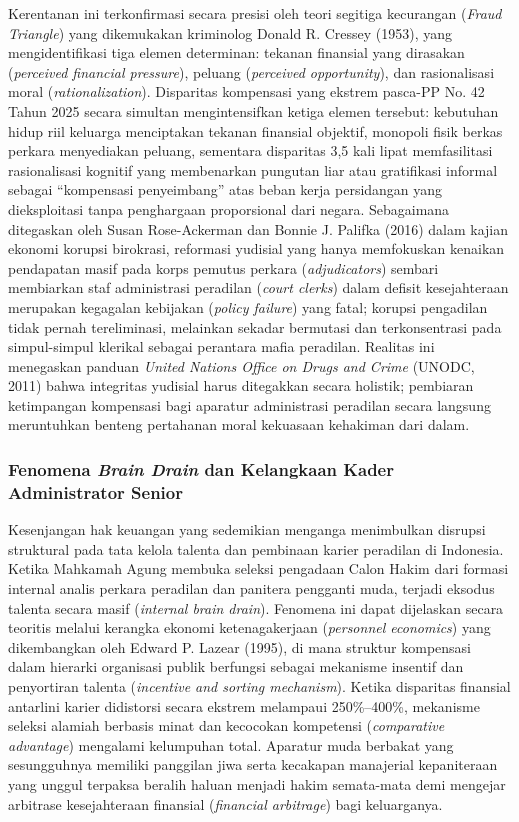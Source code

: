 \documentclass[12pt, a4paper]{article}
\begin{document}
Kerentanan ini terkonfirmasi secara presisi oleh teori segitiga kecurangan (\textit{Fraud Triangle}) yang dikemukakan kriminolog Donald R. Cressey (1953), yang mengidentifikasi tiga elemen determinan: tekanan finansial yang dirasakan (\textit{perceived financial pressure}), peluang (\textit{perceived opportunity}), dan rasionalisasi moral (\textit{rationalization}). Disparitas kompensasi yang ekstrem pasca-PP No. 42 Tahun 2025 secara simultan mengintensifkan ketiga elemen tersebut: kebutuhan hidup riil keluarga menciptakan tekanan finansial objektif, monopoli fisik berkas perkara menyediakan peluang, sementara disparitas 3,5 kali lipat memfasilitasi rasionalisasi kognitif yang membenarkan pungutan liar atau gratifikasi informal sebagai ``kompensasi penyeimbang'' atas beban kerja persidangan yang dieksploitasi tanpa penghargaan proporsional dari negara. Sebagaimana ditegaskan oleh Susan Rose-Ackerman dan Bonnie J. Palifka (2016) dalam kajian ekonomi korupsi birokrasi, reformasi yudisial yang hanya memfokuskan kenaikan pendapatan masif pada korps pemutus perkara (\textit{adjudicators}) sembari membiarkan staf administrasi peradilan (\textit{court clerks}) dalam defisit kesejahteraan merupakan kegagalan kebijakan (\textit{policy failure}) yang fatal; korupsi pengadilan tidak pernah tereliminasi, melainkan sekadar bermutasi dan terkonsentrasi pada simpul-simpul klerikal sebagai perantara mafia peradilan. Realitas ini menegaskan panduan \textit{United Nations Office on Drugs and Crime} (UNODC, 2011) bahwa integritas yudisial harus ditegakkan secara holistik; pembiaran ketimpangan kompensasi bagi aparatur administrasi peradilan secara langsung meruntuhkan benteng pertahanan moral kekuasaan kehakiman dari dalam.

\subsubsection{Fenomena \textit{Brain Drain} dan Kelangkaan Kader Administrator Senior}

Kesenjangan hak keuangan yang sedemikian menganga menimbulkan disrupsi struktural pada tata kelola talenta dan pembinaan karier peradilan di Indonesia. Ketika Mahkamah Agung membuka seleksi pengadaan Calon Hakim dari formasi internal analis perkara peradilan dan panitera pengganti muda, terjadi eksodus talenta secara masif (\textit{internal brain drain}). Fenomena ini dapat dijelaskan secara teoritis melalui kerangka ekonomi ketenagakerjaan (\textit{personnel economics}) yang dikembangkan oleh Edward P. Lazear (1995), di mana struktur kompensasi dalam hierarki organisasi publik berfungsi sebagai mekanisme insentif dan penyortiran talenta (\textit{incentive and sorting mechanism}). Ketika disparitas finansial antarlini karier didistorsi secara ekstrem melampaui 250\%--400\%, mekanisme seleksi alamiah berbasis minat dan kecocokan kompetensi (\textit{comparative advantage}) mengalami kelumpuhan total. Aparatur muda berbakat yang sesungguhnya memiliki panggilan jiwa serta kecakapan manajerial kepaniteraan yang unggul terpaksa beralih haluan menjadi hakim semata-mata demi mengejar arbitrase kesejahteraan finansial (\textit{financial arbitrage}) bagi keluarganya.
\end{document}
